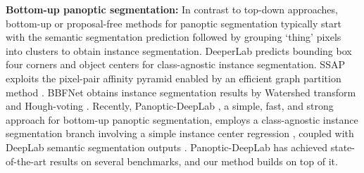 \documentclass[runningheads]{llncs}
\begin{document}
{\bf Bottom-up panoptic segmentation:} In contrast to top-down approaches, bottom-up or proposal-free methods for panoptic segmentation typically start with the semantic segmentation prediction followed by grouping `thing' pixels into clusters to obtain instance segmentation. DeeperLab \cite{yang2019deeperlab} predicts bounding box four corners and object centers for class-agnostic instance segmentation. SSAP \cite{gao2019ssap} exploits the pixel-pair affinity pyramid \cite{liu2018affinity} enabled by an efficient graph partition method \cite{keuper2015efficient}. BBFNet \cite{bonde2020towards} obtains instance segmentation results by Watershed transform \cite{vincent1991watersheds,bai2017deep} and Hough-voting \cite{ballard1981generalizing,leibe2004combined}. Recently, Panoptic-DeepLab \cite{cheng2019panoptic}, a simple, fast, and strong approach for bottom-up panoptic segmentation, employs a class-agnostic instance segmentation branch involving a simple instance center regression \cite{kendall2018multi,uhrig2018box2pix,neven2019instance}, coupled with DeepLab semantic segmentation outputs  \cite{deeplabv12015,chen2017deeplabv3,deeplabv3plus2018}. Panoptic-DeepLab has achieved state-of-the-art results on several benchmarks, and our method builds on top of it.
\end{document}
